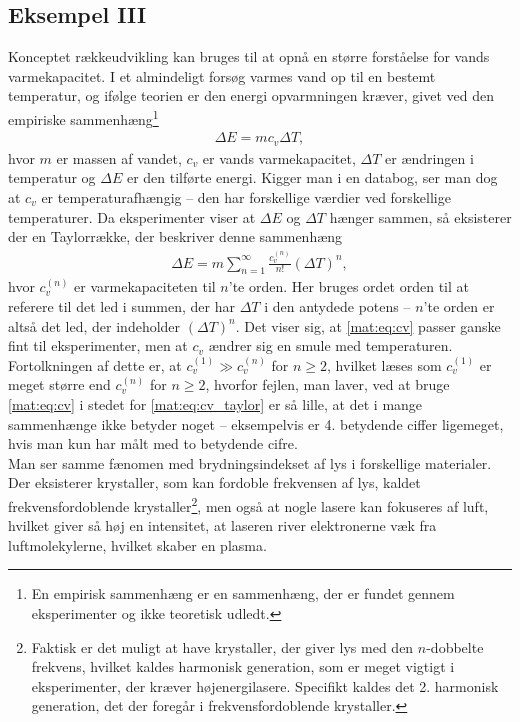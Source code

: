 \subsection{Eksempel III}
Konceptet rækkeudvikling kan bruges til at opnå en større forståelse for vands varmekapacitet. I et almindeligt forsøg varmes vand op til en bestemt temperatur, og ifølge teorien er den energi opvarmningen kræver, givet ved den empiriske sammenhæng\footnote{En empirisk sammenhæng er en sammenhæng, der er fundet gennem eksperimenter og ikke teoretisk udledt.}
%
\begin{align} \label{mat:eq:cv}
    \Delta E = mc_v\Delta T,
\end{align}
%
hvor $m$ er massen af vandet, $c_v$ er vands varmekapacitet, $\Delta T$ er ændringen i temperatur og $\Delta E$ er den tilførte energi. Kigger man i en databog, ser man dog at $c_v$ er temperaturafhængig -- den har forskellige værdier ved forskellige temperaturer. Da eksperimenter viser at $\Delta E$ og $\Delta T$ hænger sammen, så eksisterer der en Taylorrække, der beskriver denne sammenhæng
%
\begin{align} \label{mat:eq:cv_taylor}
    \Delta E = m\sum_{n=1}^\infty \frac{c_v^{(n)}}{n!}\left(\Delta T\right)^n,
\end{align}
%
hvor $c_v^{(n)}$ er varmekapaciteten til $n$'te orden. Her bruges ordet orden til at referere til det led i summen, der har $\Delta T$ i den antydede potens -- $n$'te orden er altså det led, der indeholder $\left(\Delta T\right)^n$. Det viser sig, at \cref{mat:eq:cv} passer ganske fint til eksperimenter, men at $c_v$ ændrer sig en smule med temperaturen. Fortolkningen af dette er, at $c_v^{(1)} \gg c_v^{(n)}$ for $n \geq 2$, hvilket læses som $c_v^{(1)}$ er meget større end $c_v^{(n)}$ for $n \geq 2$, hvorfor fejlen, man laver, ved at bruge \cref{mat:eq:cv} i stedet for \cref{mat:eq:cv_taylor} er så lille, at det i mange sammenhænge ikke betyder noget -- eksempelvis er 4. betydende ciffer ligemeget, hvis man kun har målt med to betydende cifre. \\
Man ser samme fænomen med brydningsindekset af lys i forskellige materialer. Der eksisterer krystaller, som kan fordoble frekvensen af lys, kaldet frekvensfordoblende krystaller\footnote{Faktisk er det muligt at have krystaller, der giver lys med den $n$-dobbelte frekvens, hvilket kaldes harmonisk generation, som er meget vigtigt i eksperimenter, der kræver højenergilasere. Specifikt kaldes det 2. harmonisk generation, det der foregår i frekvensfordoblende krystaller.}, men også at nogle lasere kan fokuseres af luft, hvilket giver så høj en intensitet, at laseren river elektronerne væk fra luftmolekylerne, hvilket skaber en plasma.